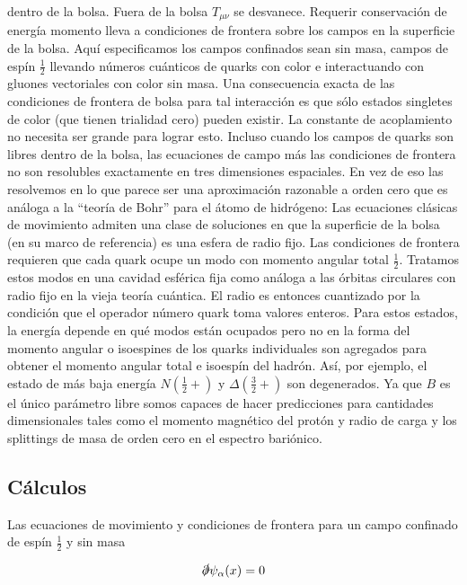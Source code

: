 dentro de la bolsa. Fuera de la bolsa ${T}_{\mu \nu}$ se desvanece. Requerir conservación de energía momento lleva a condiciones de frontera sobre los campos en la superficie de la bolsa. Aquí especificamos los campos confinados sean sin masa, campos de espín $\frac{1}{2}$ llevando números cuánticos de quarks con color e interactuando con gluones vectoriales con color sin masa. Una consecuencia exacta de las condiciones de frontera de bolsa para tal interacción es que sólo estados singletes de color (que tienen trialidad cero) pueden existir. La constante de acoplamiento no necesita ser grande para lograr esto. Incluso cuando los campos de quarks son libres dentro de la bolsa, las ecuaciones de campo más las condiciones de frontera no son resolubles exactamente en tres dimensiones espaciales. En vez de eso las resolvemos en lo que parece ser una aproximación razonable a orden cero que es análoga a la ``teoría de Bohr'' para el átomo de hidrógeno: Las ecuaciones clásicas de movimiento admiten una clase de soluciones en que la superficie de la bolsa (en su marco de referencia) es una esfera de radio fijo. Las condiciones de frontera requieren que cada quark ocupe un modo con momento angular total $\frac{1}{2}$. Tratamos estos modos en una cavidad esférica fija como análoga a las órbitas circulares con radio fijo en la vieja teoría cuántica. El radio es entonces cuantizado por la condición que el operador número quark toma valores enteros. Para estos estados, la energía depende en qué modos están ocupados pero no en la forma del momento angular o isoespines de los quarks individuales son agregados para obtener el momento angular total e isoespín del hadrón. Así, por ejemplo, el estado de más baja energía $N(\frac{1}{2} +)$ y $\Delta(\frac{3}{2} +)$ son degenerados. Ya que $B$ es el único parámetro libre somos capaces de hacer predicciones para cantidades dimensionales tales como el momento magnético del protón y radio de carga y los splittings de masa de orden cero en el espectro bariónico. 

\subsection{Cálculos}

Las ecuaciones de movimiento y condiciones de frontera para un campo confinado de espín $\frac{1}{2}$ y sin masa

\begin{equation}
\slashed{\partial} {\psi}_{\alpha}(x) = 0
\end{equation}
 
